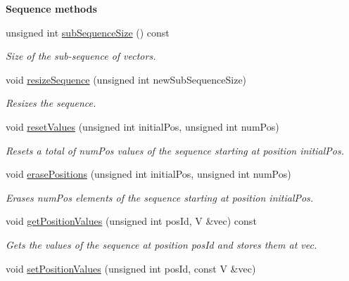 \begin{Indent}{\bf Sequence methods}\par
\begin{DoxyCompactItemize}
\item 
unsigned int \hyperlink{class_q_u_e_s_o_1_1_sequence_of_vectors_a0224bd3e961d86af5d2886301c0c2b86}{sub\-Sequence\-Size} () const 
\begin{DoxyCompactList}\small\item\em Size of the sub-\/sequence of vectors. \end{DoxyCompactList}\item 
void \hyperlink{class_q_u_e_s_o_1_1_sequence_of_vectors_a751e8d4c3791271c7100395312f37c7b}{resize\-Sequence} (unsigned int new\-Sub\-Sequence\-Size)
\begin{DoxyCompactList}\small\item\em Resizes the sequence. \end{DoxyCompactList}\item 
void \hyperlink{class_q_u_e_s_o_1_1_sequence_of_vectors_a75e0f11bb3abdf5cd691ba8769ca7222}{reset\-Values} (unsigned int initial\-Pos, unsigned int num\-Pos)
\begin{DoxyCompactList}\small\item\em Resets a total of {\ttfamily num\-Pos} values of the sequence starting at position {\ttfamily initial\-Pos}. \end{DoxyCompactList}\item 
void \hyperlink{class_q_u_e_s_o_1_1_sequence_of_vectors_a1455ec3ab1b63006a8fe85a8c169c649}{erase\-Positions} (unsigned int initial\-Pos, unsigned int num\-Pos)
\begin{DoxyCompactList}\small\item\em Erases {\ttfamily num\-Pos} elements of the sequence starting at position {\ttfamily initial\-Pos}. \end{DoxyCompactList}\item 
void \hyperlink{class_q_u_e_s_o_1_1_sequence_of_vectors_a9c46159287cb508791ea29282cd488ff}{get\-Position\-Values} (unsigned int pos\-Id, V \&vec) const 
\begin{DoxyCompactList}\small\item\em Gets the values of the sequence at position {\ttfamily pos\-Id} and stores them at {\ttfamily vec}. \end{DoxyCompactList}\item 
void \hyperlink{class_q_u_e_s_o_1_1_sequence_of_vectors_a822aecb4ddeb8da89683f6c3a1ce11c1}{set\-Position\-Values} (unsigned int pos\-Id, const V \&vec)

\end{DoxyCompactItemize}
\end{Indent}

